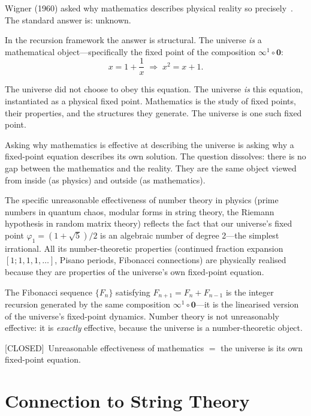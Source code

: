 \documentclass[prd,twocolumn,preprintnumbers,amsmath,amssymb]{revtex4-2}
\newcommand{\closed}{\textcolor{green!60!black}{[CLOSED]}}
\newcommand{\acc}{\mathbf{\infty}}
\newcommand{\inv}{\mathbf{0}}
\begin{document}
Wigner (1960) asked why mathematics describes physical reality so
precisely~\cite{Wigner1960}.  The standard answer is: unknown.

In the recursion framework the answer is structural.  The universe
\emph{is} a mathematical object---specifically the fixed point of the
composition $\acc^1 \circ \inv$:
\begin{equation}
  x = 1 + \frac{1}{x}
  \;\Longrightarrow\;
  x^2 = x + 1.
  \label{eq:universe_eq}
\end{equation}

The universe did not choose to obey this equation.  The universe
\emph{is} this equation, instantiated as a physical fixed point.
Mathematics is the study of fixed points, their properties, and the
structures they generate.  The universe is one such fixed point.

Asking why mathematics is effective at describing the universe is
asking why a fixed-point equation describes its own solution.  The
question dissolves: there is no gap between the mathematics and the
reality.  They are the same object viewed from inside (as physics)
and outside (as mathematics).

The specific unreasonable effectiveness of number theory in physics
(prime numbers in quantum chaos, modular forms in string theory, the
Riemann hypothesis in random matrix theory) reflects the fact that
our universe's fixed point $\varphi_1 = (1+\sqrt{5})/2$ is an
algebraic number of degree 2---the simplest irrational.  All its
number-theoretic properties (continued fraction expansion
$[1;1,1,1,\ldots]$, Pisano periods, Fibonacci connections) are
physically realised because they are properties of the universe's
own fixed-point equation.

The Fibonacci sequence $\{F_n\}$ satisfying
$F_{n+1} = F_n + F_{n-1}$ is the integer recursion generated by
the same composition $\acc^1 \circ \inv$---it is the linearised
version of the universe's fixed-point dynamics.  Number theory is
not unreasonably effective: it is \emph{exactly} effective, because
the universe is a number-theoretic object.

\closed\ Unreasonable effectiveness of mathematics $=$ the universe
is its own fixed-point equation.

\section{Connection to String Theory}
\label{sec:strings}
\end{document}
